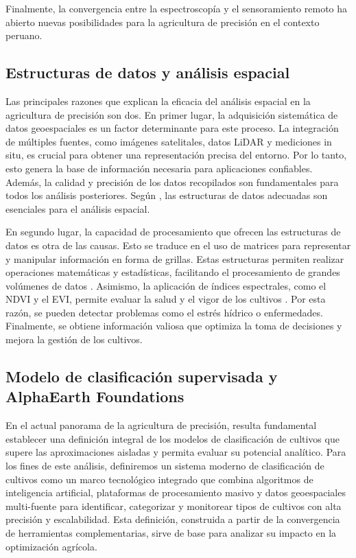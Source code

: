 Finalmente, la convergencia entre la espectroscopía y el sensoramiento remoto ha abierto nuevas posibilidades para la agricultura de precisión en el contexto peruano.

\subsection{Estructuras de datos y análisis espacial}
Las principales razones que explican la eficacia del análisis espacial en la agricultura de precisión son dos. En primer lugar, la adquisición sistemática de datos geoespaciales es un factor determinante para este proceso. La integración de múltiples fuentes, como imágenes satelitales, datos LiDAR y mediciones in situ, es crucial para obtener una representación precisa del entorno. Por lo tanto, esto genera la base de información necesaria para aplicaciones confiables. Además, la calidad y precisión de los datos recopilados son fundamentales para todos los análisis posteriores. Según \cite{Breiman2001}, las estructuras de datos adecuadas son esenciales para el análisis espacial.

En segundo lugar, la capacidad de procesamiento que ofrecen las estructuras de datos es otra de las causas. Esto se traduce en el uso de matrices para representar y manipular información en forma de grillas. Estas estructuras permiten realizar operaciones matemáticas y estadísticas, facilitando el procesamiento de grandes volúmenes de datos \cite{Gorelick2017}. Asimismo, la aplicación de índices espectrales, como el NDVI y el EVI, permite evaluar la salud y el vigor de los cultivos \cite{Brown2025}. Por esta razón, se pueden detectar problemas como el estrés hídrico o enfermedades. Finalmente, se obtiene información valiosa que optimiza la toma de decisiones y mejora la gestión de los cultivos.

\subsection{Modelo de clasificación supervisada y AlphaEarth Foundations}

En el actual panorama de la agricultura de precisión, resulta fundamental establecer una definición integral de los modelos de clasificación de cultivos que supere las aproximaciones aisladas y permita evaluar su potencial analítico. Para los fines de este análisis, definiremos un sistema moderno de clasificación de cultivos como un marco tecnológico integrado que combina algoritmos de inteligencia artificial, plataformas de procesamiento masivo y datos geoespaciales multi-fuente para identificar, categorizar y monitorear tipos de cultivos con alta precisión y escalabilidad. Esta definición, construida a partir de la convergencia de herramientas complementarias, sirve de base para analizar su impacto en la optimización agrícola.

